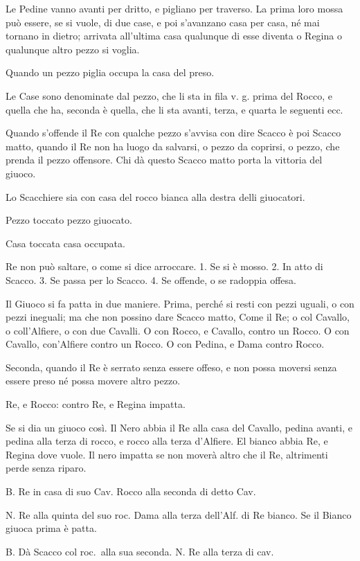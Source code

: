 \documentclass[11pt,a6paper]{article}
\begin{document}
Le Pedine vanno avanti per dritto, e pigliano
per traverso. La prima loro mossa
può essere, se si vuole, di due case, e poi
s'avanzano casa per casa, né mai tornano in
dietro; arrivata all'ultima casa qualunque di
esse diventa o Regina o qualunque altro
pezzo si voglia.

Quando un pezzo piglia occupa la casa
del preso.

Le Case sono denominate dal pezzo, che
li sta in fila v. g. prima del Rocco, e quella
che ha, seconda è quella, che li sta avanti,
terza, e quarta le seguenti ecc.

Quando s'offende il Re con qualche pezzo
s'avvisa con dire Scacco è poi Scacco
matto, quando il Re non ha luogo da salvarsi, o
pezzo da coprirsi, o pezzo, che prenda il
pezzo offensore. Chi dà questo Scacco matto
porta la vittoria del giuoco.

Lo Scacchiere sia con casa del rocco bianca
alla destra delli giuocatori.

Pezzo toccato pezzo giuocato.

Casa toccata casa occupata.

Re non può saltare, o come si dice arroccare.
1. Se si è mosso. 2. In atto di Scacco.
3. Se passa per lo Scacco. 4. Se offende, o se
radoppia offesa.

Il Giuoco si fa patta in due maniere. Prima,
perché si resti con pezzi uguali, o con pezzi
ineguali; ma che non possino dare Scacco
matto, Come il Re; o col Cavallo, o
coll'Alfiere, o con due Cavalli. O con Rocco, e
Cavallo, contro un Rocco. O con Cavallo,
con'Alfiere contro un Rocco. O con Pedina,
e Dama contro Rocco.

Seconda, quando il Re è serrato senza
essere offeso, e non possa moversi senza essere
preso né possa movere altro pezzo.

Re, e Rocco: contro Re, e Regina impatta.

Se si dia un giuoco così. Il Nero abbia il
Re alla casa del Cavallo, pedina avanti, e
pedina alla terza di rocco, e rocco alla terza
d'Alfiere. El bianco abbia Re, e Regina dove
vuole. Il nero impatta se non moverà altro
che il Re, altrimenti perde senza riparo.

B. Re in casa di suo Cav. Rocco alla seconda di detto Cav.

N. Re alla quinta del suo roc. Dama alla
terza dell'Alf. di Re bianco. Se il Bianco
giuoca prima è patta.

B. Dà Scacco col roc.\ alla sua seconda.
N. Re alla terza di cav.
\end{document}
